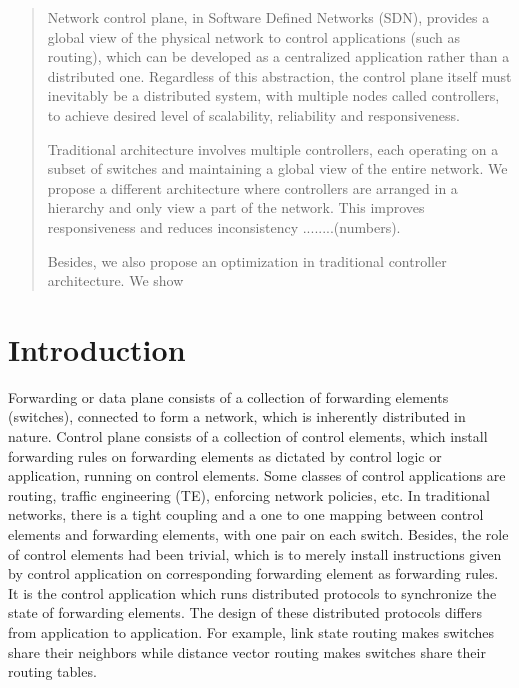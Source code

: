 \documentclass[10pt, twocolumn]{article}
\begin{document}
\maketitle
\begin{abstract}
Network control plane, in Software Defined Networks (SDN), provides a global view of the physical network to control applications (such as routing), which can be developed as a centralized application rather than a distributed one. Regardless of this abstraction, the control plane itself must inevitably be a distributed system, with multiple nodes called controllers, to achieve desired level of scalability, reliability and responsiveness. 

Traditional architecture involves multiple controllers, each operating on a subset of switches and maintaining a global view of the entire network. We propose a different architecture where controllers are arranged in a hierarchy and only view a part of the network. This improves responsiveness and reduces inconsistency ........(numbers).

Besides, we also propose an optimization in traditional controller architecture. We show 
\end{abstract}

\section{Introduction}
Forwarding or data plane consists of a collection of forwarding elements (switches), connected to form a network, which is inherently distributed in nature. Control plane consists of a collection of control elements, which install forwarding rules on forwarding elements as dictated by control logic or application, running on control elements. Some classes of control applications are routing, traffic engineering (TE), enforcing network policies, etc. In traditional networks, there is a tight coupling and a one to one mapping between control elements and forwarding elements, with one pair on each switch. Besides, the role of control elements had been trivial, which is to merely install instructions given by control application on corresponding forwarding element as forwarding rules. It is the control application which runs distributed protocols to synchronize the state of forwarding elements. The design of these distributed protocols differs from application to application. For example, link state routing makes switches share their neighbors while distance vector routing makes switches share their routing tables.
\end{document}

